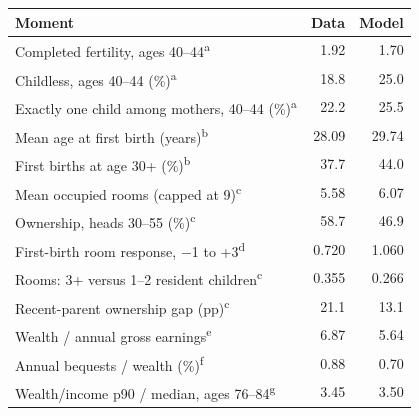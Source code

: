 \begin{tabularx}{\textwidth}{@{}Xrr@{}}
\toprule
Moment & Data & Model \\
\midrule
Completed fertility, ages 40--44\textsuperscript{a} & 1.92 & 1.70 \\
Childless, ages 40--44 (\%)\textsuperscript{a} & 18.8 & 25.0 \\
Exactly one child among mothers, 40--44 (\%)\textsuperscript{a} & 22.2 & 25.5 \\
Mean age at first birth (years)\textsuperscript{b} & 28.09 & 29.74 \\
First births at age 30+ (\%)\textsuperscript{b} & 37.7 & 44.0 \\
\addlinespace[4pt]
Mean occupied rooms (capped at 9)\textsuperscript{c} & 5.58 & 6.07 \\
Ownership, heads 30--55 (\%)\textsuperscript{c} & 58.7 & 46.9 \\
First-birth room response, $-$1 to +3\textsuperscript{d} & 0.720 & 1.060 \\
Rooms: 3+ versus 1--2 resident children\textsuperscript{c} & 0.355 & 0.266 \\
Recent-parent ownership gap (pp)\textsuperscript{c} & 21.1 & 13.1 \\
\addlinespace[4pt]
Wealth / annual gross earnings\textsuperscript{e} & 6.87 & 5.64 \\
Annual bequests / wealth (\%)\textsuperscript{f} & 0.88 & 0.70 \\
Wealth/income p90 / median, ages 76--84\textsuperscript{g} & 3.45 & 3.50 \\
\bottomrule
\end{tabularx}

